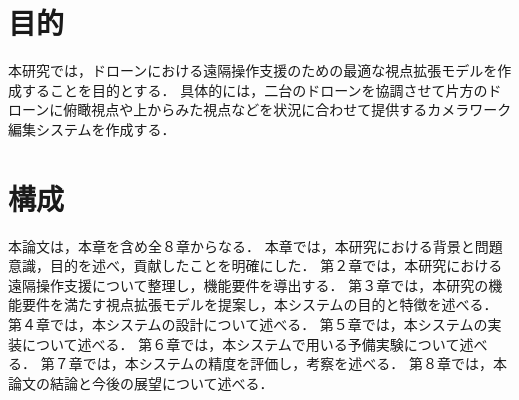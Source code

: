 


\section{目的}
本研究では，ドローンにおける遠隔操作支援のための最適な視点拡張モデルを作成することを目的とする．
具体的には，二台のドローンを協調させて片方のドローンに俯瞰視点や上からみた視点などを状況に合わせて提供するカメラワーク編集システムを作成する．




\section{構成}
本論文は，本章を含め全８章からなる．
本章では，本研究における背景と問題意識，目的を述べ，貢献したことを明確にした．
第２章では，本研究における遠隔操作支援について整理し，機能要件を導出する．
第３章では，本研究の機能要件を満たす視点拡張モデルを提案し，本システムの目的と特徴を述べる．
第４章では，本システムの設計について述べる．
第５章では，本システムの実装について述べる．
第６章では，本システムで用いる予備実験について述べる．
第７章では，本システムの精度を評価し，考察を述べる．
第８章では，本論文の結論と今後の展望について述べる．

